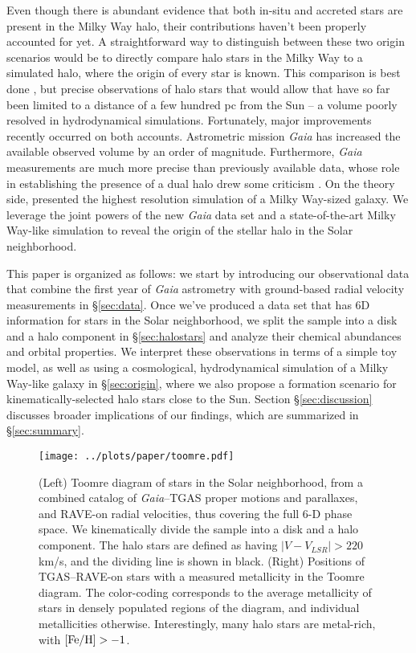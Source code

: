 \documentclass[apj, twocolappendix, numberedappendix, appendixfloats]{emulateapj}
\begin{document}
Even though there is abundant evidence that both in-situ and accreted stars are present in the Milky Way halo, their contributions haven't been properly accounted for yet.
A straightforward way to distinguish between these two origin scenarios would be to directly compare halo stars in the Milky Way to a simulated halo, where the origin of every star is known.
This comparison is best done , but precise observations of halo stars that would allow that have so far been limited to a distance of a few hundred pc from the Sun -- a volume poorly resolved in hydrodynamical simulations.
Fortunately, major improvements recently occurred on both accounts.
Astrometric mission \emph{Gaia} \citep{perryman2001} has increased the available observed volume by an order of magnitude.
Furthermore, \emph{Gaia} measurements are much more precise than previously available data, whose role in establishing the presence of a dual halo drew some criticism \citep{schonrich2011, schonrich2014}.
On the theory side, \citet{wetzel2016} presented the highest resolution simulation of a Milky Way-sized galaxy. 
We leverage the joint powers of the new \emph{Gaia} data set and a state-of-the-art Milky Way-like simulation to reveal the origin of the stellar halo in the Solar neighborhood.

This paper is organized as follows: we start by introducing our observational data that combine the first year of \emph{Gaia} astrometry with ground-based radial velocity measurements in \S\ref{sec:data}.
Once we've produced a data set that has 6D information for stars in the Solar neighborhood, we split the sample into a disk and a halo component in \S\ref{sec:halostars} and analyze their chemical abundances and orbital properties.
We interpret these observations in terms of a simple toy model, as well as using a cosmological, hydrodynamical simulation of a Milky Way-like galaxy in \S\ref{sec:origin}, where we also propose a formation scenario for kinematically-selected halo stars close to the Sun.
Section \S\ref{sec:discussion} discusses broader implications of our findings, which are summarized in \S\ref{sec:summary}.


\begin{figure*}
\begin{center}
\texttt{[image: ../plots/paper/toomre.pdf]}
\caption{(Left) Toomre diagram of stars in the Solar neighborhood, from a combined catalog of \emph{Gaia}--TGAS proper motions and parallaxes, and RAVE-on radial velocities, thus covering the full 6-D phase space.
We kinematically divide the sample into a disk and a halo component.
The halo stars are defined as having $|V-V_{LSR}|>220$\,km/s, and the dividing line is shown in black.
(Right) Positions of TGAS--RAVE-on stars with a measured metallicity in the Toomre diagram.
The color-coding corresponds to the average metallicity of stars in densely populated regions of the diagram, and individual metallicities otherwise.
Interestingly, many halo stars are metal-rich, with $\rm[Fe/H]>-1$.}
\label{fig:toomre}
\end{center}
\end{figure*}
\end{document}
